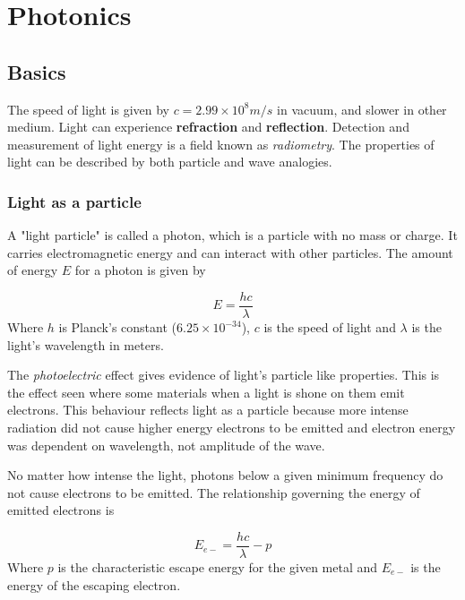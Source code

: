\chapter{Photonics}
\label{ch:marketbasics}

\section{Basics}

The speed of light is given by $c=2.99\times10^8m/s$ in vacuum, and slower in other medium. Light can experience \textbf{refraction} and \textbf{reflection}. Detection and measurement of light energy is a field known as {\it radiometry}. The properties of light can be described by both particle and wave analogies. 

\subsection{Light as a particle}

A "light particle" is called a photon, which is a particle with no mass or charge. It carries electromagnetic energy and can interact with other particles. The amount of energy $E$ for a photon is given by 

\begin{equation}
E=\frac{hc}{\lambda}
\end{equation}
Where $h$ is Planck's constant ($6.25\times10^{-34}$), $c$ is the speed of light and $\lambda$ is the light's wavelength in meters.

The {\it photoelectric} effect gives evidence of light's particle like properties. This is the effect seen where some materials when a light is shone on them emit electrons. This behaviour reflects light as a particle because more intense radiation did not cause higher energy electrons to be emitted and electron energy was dependent on wavelength, not amplitude of the wave.

No matter how intense the light, photons below a given minimum frequency do not cause electrons to be emitted. The relationship governing the energy of emitted electrons is

\begin{equation}
E_{e-} = \frac{hc}{\lambda} - p
\end{equation}
Where $p$ is the characteristic escape energy for the given metal and $E_{e-}$ is the energy of the escaping electron.


